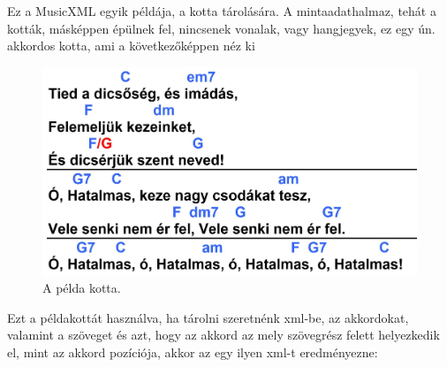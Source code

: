 Ez a MusicXML egyik példája, a kotta tárolására. A mintaadathalmaz, tehát a kották, másképpen épülnek fel, nincsenek vonalak, vagy hangjegyek, ez egy ún. akkordos kotta, ami a következőképpen néz ki
\newpage
{}
\begin{figure}[h]
	\includegraphics[scale=0.3]{../ImageProcessing/samples/images/Tied a dicsőség.JPG}
	\caption{A példa kotta.}
	\label{fig:song1}
\end{figure}

Ezt a példakottát használva, ha tárolni szeretnénk xml-be, az akkordokat, valamint a szöveget és azt, hogy az akkord az mely szövegrész felett helyezkedik el, mint az akkord pozíciója, akkor az egy ilyen xml-t eredményezne:


